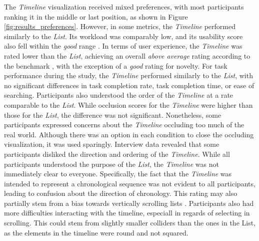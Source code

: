 The \textit{Timeline} visualization received mixed preferences, with most participants ranking it in the middle or last position, as shown in Figure \ref{fig:results_preferences}. However, in some metrics, the \textit{Timeline} performed similarly to the \textit{List}. Its workload was comparably low, and its usability score also fell within the \textit{good} range \cite{bangor2009sus}. In terms of user experience, the \textit{Timeline} was rated lower than the \textit{List}, achieving an overall \textit{above average} rating according to the benchmark \cite{schrepp2017construction}, with the exception of a \textit{good} rating for novelty. For task performance during the study, the \textit{Timeline} performed similarly to the \textit{List}, with no significant differences in task completion rate, task completion time, or ease of searching. Participants also understood the order of the \textit{Timeline} at a rate comparable to the \textit{List}. While occlusion scores for the \textit{Timeline} were higher than those for the \textit{List}, the difference was not significant. Nonetheless, some participants expressed concerns about the \textit{Timeline} occluding too much of the real world. Although there was an option in each condition to close the occluding visualization, it was used sparingly. Interview data revealed that some participants disliked the direction and ordering of the \textit{Timeline}. While all participants understood the purpose of the \textit{List}, the \textit{Timeline} was not immediately clear to everyone. Specifically, the fact that the \textit{Timeline} was intended to represent a chronological sequence was not evident to all participants, leading to confusion about the direction of chronology. This rating may also partially stem from a bias towards vertically scrolling lists \cite{kim2016pagination}. Participants also had more difficulties interacting with the timeline, especiall in regards of selecting in scrolling. This could stem from slightly smaller colliders than the ones in the List, as the elements in the timeline were round and not squared.

